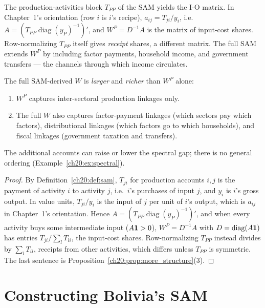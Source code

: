 \documentclass[../structural_economics_book.tex]{subfiles}
\begin{document}
\begin{proposition}\label{ch20:prop:submatrix}
The production-activities block $T_{PP}$ of the SAM yields the I-O matrix. In Chapter~1's orientation (row $i$ is $i$'s recipe), $a_{ij} = T_{ji}/y_i$, i.e.\ $A = (T_{PP}\operatorname{diag}(y_P)^{-1})'$, and $W^P = D^{-1}A$ is the matrix of input-cost shares. Row-normalizing $T_{PP}$ itself gives \emph{receipt} shares, a different matrix. The full SAM extends $W^P$ by including factor payments, household income, and government transfers --- the channels through which income circulates.

The full SAM-derived $W$ is \textit{larger} and \textit{richer} than $W^P$ alone:
\begin{enumerate}
\item $W^P$ captures inter-sectoral production linkages only.
\item The full $W$ also captures factor-payment linkages (which sectors pay which factors), distributional linkages (which factors go to which households), and fiscal linkages (government taxation and transfers).
\end{enumerate}
The additional accounts can raise or lower the spectral gap; there is no general ordering (Example~\ref{ch20:ex:spectral}).
\end{proposition}

\begin{proof}
By Definition~\ref{ch20:def:sam}, $T_{ji}$ for production accounts $i, j$ is the payment of activity $i$ to activity $j$, i.e.\ $i$'s purchases of input $j$, and $y_i$ is $i$'s gross output. In value units, $T_{ji}/y_i$ is the input of $j$ per unit of $i$'s output, which is $a_{ij}$ in Chapter~1's orientation. Hence $A = (T_{PP}\operatorname{diag}(y_P)^{-1})'$, and when every activity buys some intermediate input ($A\mathbf{1} > 0$), $W^P = D^{-1}A$ with $D = \operatorname{diag}(A\mathbf{1})$ has entries $T_{ji}/\sum_l T_{li}$, the input-cost shares. Row-normalizing $T_{PP}$ instead divides by $\sum_l T_{il}$, receipts from other activities, which differs unless $T_{PP}$ is symmetric. The last sentence is Proposition~\ref{ch20:prop:more_structure}(3).
\end{proof}


\section{Constructing Bolivia's SAM}
\label{ch20:sec:bolivia_sam}
\end{document}
